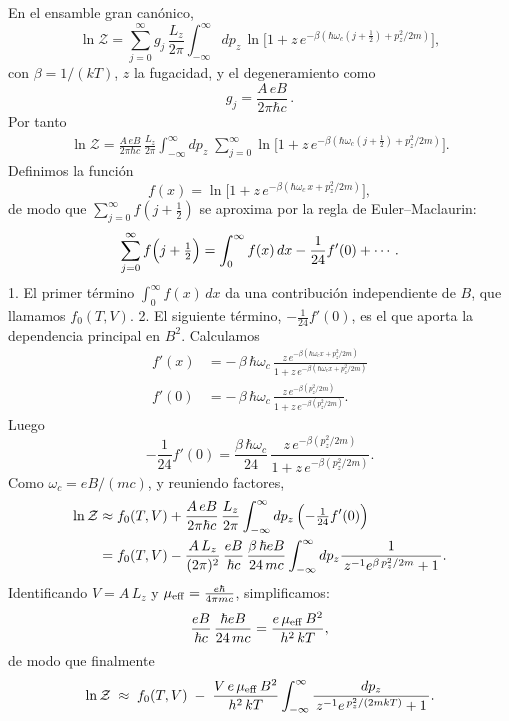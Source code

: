 \documentclass{report}
\begin{document}
En el ensamble gran canónico,
\[
\ln \mathcal{Z}
=\sum_{j=0}^\infty g_j
  \,\frac{L_z}{2\pi}\int_{-\infty}^\infty dp_z\,
  \ln\bigl[1 + z\,e^{-\beta(\hbar\omega_c(j+\tfrac12)+p_z^2/2m)}\bigr],
\]
con \(\beta=1/(kT)\), \(z\) la fugacidad, y el degeneramiento como
\[
g_j
=\frac{A\,eB}{2\pi\hbar c}\,.
\]
Por tanto
\begin{align*}
\ln \mathcal{Z}
=\frac{A\,eB}{2\pi\hbar c}\,\frac{L_z}{2\pi}
\int_{-\infty}^{\infty}dp_z
\;\sum_{j=0}^\infty
\ln\!\bigl[1 + z\,e^{-\beta(\hbar\omega_c(j+\tfrac12)+p_z^2/2m)}\bigr].
\end{align*}
Definimos la función
\[
f(x)
=\ln\!\bigl[1 + z\,e^{-\beta(\hbar\omega_c\,x + p_z^2/2m)}\bigr],
\]
de modo que \(\sum_{j=0}^\infty f(j+\tfrac12)\) se aproxima por la regla de Euler–Maclaurin:
\[
\sum_{j=0}^\infty f\Bigl(j+\tfrac12\Bigr)
=\int_{0}^{\infty}f(x)\,dx
-\frac1{24}f'(0)+\cdots.
\]
1. El primer término
\(\displaystyle \int_0^\infty f(x)\,dx\) da una contribución independiente de \(B\),
que llamamos \(f_0(T,V)\).  
2. El siguiente término, \(-\tfrac1{24}f'(0)\), es el que aporta la dependencia principal en \(B^2\).  
   Calculamos
   \begin{align*}
   f'(x)
     &= -\,\beta\,\hbar\omega_c\,
     \frac{z\,e^{-\beta(\hbar\omega_c x + p_z^2/2m)}}
          {1 + z\,e^{-\beta(\hbar\omega_c x + p_z^2/2m)}}\\
   f'(0)
     &= -\,\beta\,\hbar\omega_c\,
     \frac{z\,e^{-\beta(p_z^2/2m)}}
          {1 + z\,e^{-\beta(p_z^2/2m)}}.
          \end{align*}
   Luego
   \[
   -\frac1{24}f'(0)
   = \frac{\beta\,\hbar\omega_c}{24}
     \,\frac{z\,e^{-\beta(p_z^2/2m)}}
          {1 + z\,e^{-\beta(p_z^2/2m)}}.
   \]
   Como \(\omega_c=eB/(mc)\), y reuniendo factores,
   \begin{align*}
   \ln \mathcal{Z}
     &\approx f_0(T,V)
   + \frac{A\,eB}{2\pi\hbar c}\,\frac{L_z}{2\pi}
     \int_{-\infty}^\infty dp_z
     \,\Bigl(-\tfrac1{24}f'(0)\Bigr)\\
     &=f_0(T,V)
   -\frac{A\,L_z}{(2\pi)^2}\,
    \frac{eB}{\hbar c}\,
    \frac{\beta\,\hbar eB}{24\,m c}
   \int_{-\infty}^\infty dp_z
   \frac{1}{\,z^{-1}e^{\beta\,p_z^2/2m}+1\,}.
   \end{align*}
   Identificando \(V=A\,L_z\) y \(\mu_{\rm eff}=\tfrac{e\hbar}{4\pi m c}\), simplificamos:
   \[
   \frac{eB}{\hbar c}\,\frac{\hbar eB}{24\,m c}
   =\frac{e\,\mu_{\rm eff}\,B^2}{h^2\,kT},
   \]
   de modo que finalmente
   \[
     \ln \mathcal{Z}
     \;\approx\;
     f_0(T,V)
     \;-\;
     \frac{V\,e\,\mu_{\rm eff}\,B^2}{h^2\,kT}
     \int_{-\infty}^{\infty}
       \frac{dp_z}{\,z^{-1}e^{\,p_z^2/(2mkT)}+1\,}.
   \]
\end{document}
